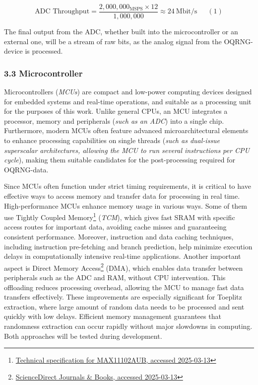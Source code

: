 \[
\text{ADC Throughput}
= \frac{2,000,000_{\mathrm{MSPS}}\times12}{1,000,000}
\approx24\ \mathrm{Mbit/s}\phantom{123}(1)
\]

The final output from the ADC, whether built into the microcontroller or an external one, will be a stream of raw bits, as the analog signal from the OQRNG-device is processed.

\hypertarget{microcontroller}{%
\subsubsection{3.3 Microcontroller}\label{microcontroller}}

Microcontrollers (\emph{MCUs}) are compact and low-power computing devices designed for embedded systems and real-time operations, and suitable as a processing unit for the purposes of this work. Unlike general CPUs, an MCU integrates a processor, memory and peripherals (\emph{such as an ADC}) into a single chip. Furthermore, modern MCUs often feature advanced microarchitectural elements to enhance processing capabilities on single threads (\emph{such as dual-issue superscalar architectures, allowing the MCU to run several instructions per CPU cycle}), making them suitable candidates for the post-processing required for OQRNG-data.

Since MCUs often function under strict timing requirements, it is critical to have effective ways to access memory and transfer data for processing in real time. High-performance MCUs enhance memory usage in various ways. Some of them use Tightly Coupled Memory\footnote{\href{https://www.farnell.com/datasheets/1913106.pdf}{Technical specification for MAX11102AUB, accessed 2025-03-13}} (\emph{TCM}), which gives fast SRAM with specific access routes for important data, avoiding cache misses and guaranteeing consistent performance. Moreover, instruction and data caching techniques, including instruction pre-fetching and branch prediction, help minimize execution delays in computationally intensive real-time applications. Another important aspect is Direct Memory Access\footnote{\href{https://www.sciencedirect.com/topics/computer-science/direct-memory-access}{ScienceDirect Journals \& Books, accessed 2025-03-13}} (DMA), which enables data transfer between peripherals such as the ADC and RAM, without CPU intervention. This offloading reduces processing overhead, allowing the MCU to manage fast data transfers effectively. These improvements are especially significant for Toeplitz extraction, where large amount of random data needs to be processed and sent quickly with low delays. Efficient memory management guarantees that randomness extraction can occur rapidly without major slowdowns in computing. Both approaches will be tested during development.

